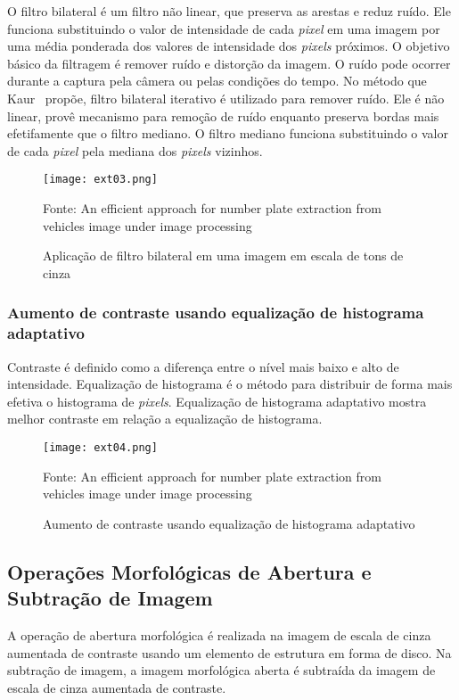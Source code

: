 O filtro bilateral é um filtro não linear, que preserva as arestas e reduz ruído.
Ele funciona substituindo o valor de intensidade de cada \emph{pixel} em uma imagem
por uma média ponderada dos valores de intensidade dos \emph{pixels} próximos.
O objetivo básico da filtragem é remover ruído e distorção da imagem. O ruído
pode ocorrer durante a captura pela câmera ou pelas condições do tempo. No
método que Kaur~\cite{kaur2014efficient} propõe, filtro bilateral iterativo é
utilizado para remover ruído. Ele é não linear, provê mecanismo para remoção de
ruído enquanto preserva bordas mais efetifamente que o filtro mediano. O filtro
mediano funciona substituindo o valor de cada \emph{pixel} pela mediana dos \emph{pixels}
vizinhos.

\begin{figure}[H]
	\centering
	\texttt{[image: ext03.png]}
	\caption{Aplicação de filtro bilateral em uma imagem em escala de tons de cinza}
Fonte: An efficient approach for number plate extraction from vehicles image under image processing~\cite{kaur2014efficient}
	\label{fig:ext_filter_in_gray_scale}
\end{figure}

\subsubsection{Aumento de contraste usando equalização de histograma adaptativo}

Contraste é definido como a diferença entre o nível mais baixo e alto de
intensidade. Equalização de histograma é o método para distribuir de forma mais
efetiva o histograma de \emph{pixels}. Equalização de histograma adaptativo
mostra melhor contraste em relação a equalização de histograma.

\begin{figure}[H]
	\centering
	\texttt{[image: ext04.png]}
	\caption{Aumento de contraste usando equalização de histograma adaptativo}
Fonte: An efficient approach for number plate extraction from vehicles image under image processing~\cite{kaur2014efficient}
	\label{fig:ext_contrast_adaptive_histogram}
\end{figure}

\subsection{Operações Morfológicas de Abertura e Subtração de Imagem}

A operação de abertura morfológica é realizada na imagem de escala de cinza
aumentada de contraste usando um elemento de estrutura em forma de disco. Na
subtração de imagem, a imagem morfológica aberta é subtraída da imagem de escala
de cinza aumentada de contraste.

